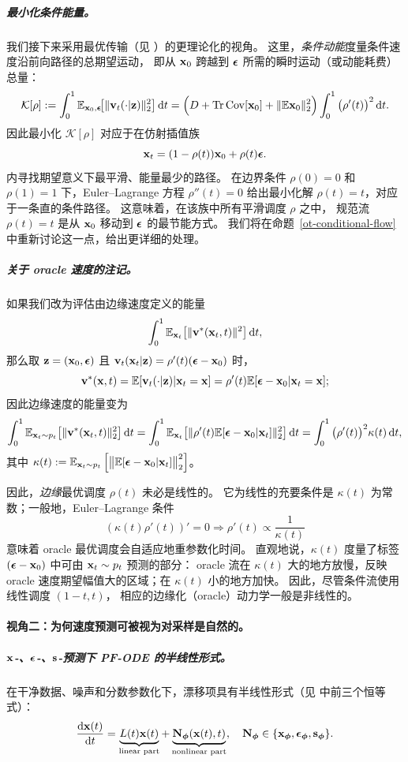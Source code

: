 \subparagraph{最小化条件能量。} 我们接下来采用最优传输（见 ）的更理论化的视角。
这里，\emph{条件动能}度量条件速度沿前向路径的总期望运动，
即从 ${\mathbf{x}}_0$ 跨越到 ${\bm{\epsilon}}$ 所需的瞬时运动（或动能耗费）总量：
\[
\mathcal K[\rho]
:=\int_0^1 \mathbb{E}_{{\mathbf{x}}_0,{\bm{\epsilon}}}\!\big[\|{\mathbf{v}}_t(\cdot |{\mathbf{z}})\|_2^2\big]\mathop{}\!\mathrm{d} t
=\Big(D+\operatorname{Tr}\mathrm{Cov}[{\mathbf{x}}_0]+\|\mathbb{E}{\mathbf{x}}_0\|_2^2\Big)
\int_0^1 \big(\rho'(t)\big)^2\mathop{}\!\mathrm{d} t.
\]
因此最小化 $\mathcal K[\rho]$ 对应于在仿射插值族
\[
{\mathbf{x}}_t=(1-\rho(t)){\mathbf{x}}_0+\rho(t){\bm{\epsilon}}.
\]
内寻找期望意义下最平滑、能量最少的路径。
在边界条件 $\rho(0)=0$ 和 $\rho(1)=1$ 下，Euler--Lagrange 方程 $\rho''(t)=0$ 给出最小化解 $\rho(t)=t$，对应于一条直的条件路径。
这意味着，在该族中所有平滑调度 $\rho$ 之中，
规范流 $\rho(t)=t$ 是从 ${\mathbf{x}}_0$ 移动到 ${\bm{\epsilon}}$ 的最节能方式。
我们将在命题~\ref{ot-conditional-flow} 中重新讨论这一点，给出更详细的处理。


\subparagraph{关于 oracle 速度的注记。}
如果我们改为评估由边缘速度定义的能量
\[
\int_0^1 \mathbb{E}_{{\mathbf{x}}_t} \big[\|{\mathbf{v}}^*({\mathbf{x}}_t, t)\|^2\big]\mathop{}\!\mathrm{d} t,
\]
那么取 ${\mathbf{z}}=({\mathbf{x}}_0,{\bm{\epsilon}})$ 且 ${\mathbf{v}}_t({\mathbf{x}}_t |{\mathbf{z}})=\rho'(t)({\bm{\epsilon}}-{\mathbf{x}}_0)$ 时，
\[
{\mathbf{v}}^*({\mathbf{x}}, t)
=\mathbb{E}[{\mathbf{v}}_t(\cdot|{\mathbf{z}})|{\mathbf{x}}_t={\mathbf{x}}]
=\rho'(t) \mathbb{E}[{\bm{\epsilon}}-{\mathbf{x}}_0|{\mathbf{x}}_t={\mathbf{x}}];
\]
因此边缘速度的能量变为
\begin{align*}
  \int_0^1 \mathbb{E}_{{\mathbf{x}}_t\sim p_t} \big[\|{\mathbf{v}}^*({\mathbf{x}}_t, t)\|^2_2\big]\mathop{}\!\mathrm{d} t
   = \int_0^1 \mathbb{E}_{{\mathbf{x}}_t} \big[\| \rho'(t) \mathbb{E}[{\bm{\epsilon}}-{\mathbf{x}}_0|{\mathbf{x}}_t] \|^2_2\big]\mathop{}\!\mathrm{d} t  = \int_0^1 \big(\rho'(t)\big)^2 \kappa(t) \mathop{}\!\mathrm{d} t,
\end{align*}
其中 $\kappa(t):=\mathbb{E}_{{\mathbf{x}}_t\sim p_t} \left[\big\|\mathbb{E}[{\bm{\epsilon}}-{\mathbf{x}}_0|{\mathbf{x}}_t]\big\|^2_2\right]
$。

因此，\emph{边缘}最优调度 $\rho(t)$ 未必是线性的。
它为线性的充要条件是 $\kappa(t)$ 为常数；一般地，Euler–Lagrange 条件
\[
(\kappa(t)\rho'(t))' = 0  \Rightarrow  \rho'(t)\propto \frac{1}{\kappa(t)}
\]
意味着 oracle 最优调度会自适应地重参数化时间。
直观地说，$\kappa(t)$ 度量了标签 $({\bm{\epsilon}}-{\mathbf{x}}_0)$ 中可由 ${\mathbf{x}}_t\sim p_t$ 预测的部分：
oracle 流在 $\kappa(t)$ 大的地方放慢，反映 oracle 速度期望幅值大的区域；在 $\kappa(t)$ 小的地方加快。
因此，尽管条件流使用线性调度 $(1-t,t)$，
相应的边缘化（oracle）动力学一般是非线性的。



\paragraph{视角二：为何速度预测可被视为对采样是自然的。}

\subparagraph{${\mathbf{x}}$-、${\bm{\epsilon}}$-、${\mathbf{s}}$-预测下 PF-ODE 的半线性形式。}
在干净数据、噪声和分数参数化下，漂移项具有半线性形式（见  中前三个恒等式）：
\[
\frac{\mathop{}\!\mathrm{d} {\mathbf{x}}(t)}{\mathop{}\!\mathrm{d} t}= \underbrace{L(t) {\mathbf{x}}(t)}_{\text{linear part}} + \underbrace{{\mathbf{N}}_{\bm{\phi}}({\mathbf{x}}(t),t)}_{\text{nonlinear part}},
\quad
{\mathbf{N}}_{\bm{\phi}}\in\{{\mathbf{x}}_{{\bm{\phi}}}, {\bm{\epsilon}}_{{\bm{\phi}}}, {\mathbf{s}}_{{\bm{\phi}}}\}.
\]



